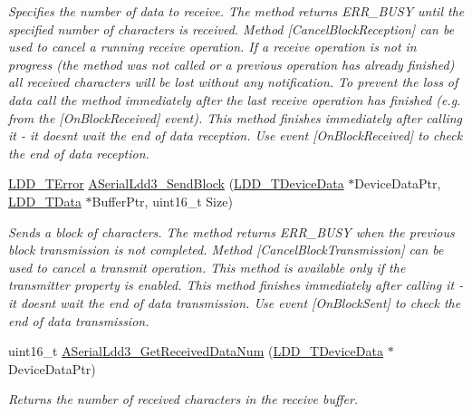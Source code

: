 \begin{DoxyCompactItemize}
\begin{DoxyCompactList}\small\item\em Specifies the number of data to receive. The method returns E\+R\+R\+\_\+\+B\+U\+SY until the specified number of characters is received. Method \mbox{[}Cancel\+Block\+Reception\mbox{]} can be used to cancel a running receive operation. If a receive operation is not in progress (the method was not called or a previous operation has already finished) all received characters will be lost without any notification. To prevent the loss of data call the method immediately after the last receive operation has finished (e.\+g. from the \mbox{[}On\+Block\+Received\mbox{]} event). This method finishes immediately after calling it -\/ it doesn\textquotesingle{}t wait the end of data reception. Use event \mbox{[}On\+Block\+Received\mbox{]} to check the end of data reception. \end{DoxyCompactList}\item 
\hyperlink{group___p_e___types__module_ga24c2b045fd04e79e85f261ce4df35588}{L\+D\+D\+\_\+\+T\+Error} \hyperlink{group___a_serial_ldd3__module_gaaea04fed3f7352cabdf4899e4ca57a27}{A\+Serial\+Ldd3\+\_\+\+Send\+Block} (\hyperlink{group___p_e___types__module_gac5cf1362f1f0e3a2ce71b1bf2276d091}{L\+D\+D\+\_\+\+T\+Device\+Data} $\ast$Device\+Data\+Ptr, \hyperlink{group___p_e___types__module_gade8ef9401405bd941b6da738b807f980}{L\+D\+D\+\_\+\+T\+Data} $\ast$Buffer\+Ptr, uint16\+\_\+t Size)
\begin{DoxyCompactList}\small\item\em Sends a block of characters. The method returns E\+R\+R\+\_\+\+B\+U\+SY when the previous block transmission is not completed. Method \mbox{[}Cancel\+Block\+Transmission\mbox{]} can be used to cancel a transmit operation. This method is available only if the transmitter property is enabled. This method finishes immediately after calling it -\/ it doesn\textquotesingle{}t wait the end of data transmission. Use event \mbox{[}On\+Block\+Sent\mbox{]} to check the end of data transmission. \end{DoxyCompactList}\item 
uint16\+\_\+t \hyperlink{group___a_serial_ldd3__module_ga45d165be1a142f81773e53c48aa85253}{A\+Serial\+Ldd3\+\_\+\+Get\+Received\+Data\+Num} (\hyperlink{group___p_e___types__module_gac5cf1362f1f0e3a2ce71b1bf2276d091}{L\+D\+D\+\_\+\+T\+Device\+Data} $\ast$Device\+Data\+Ptr)
\begin{DoxyCompactList}\small\item\em Returns the number of received characters in the receive buffer. \end{DoxyCompactList}\item 

\end{DoxyCompactItemize}
